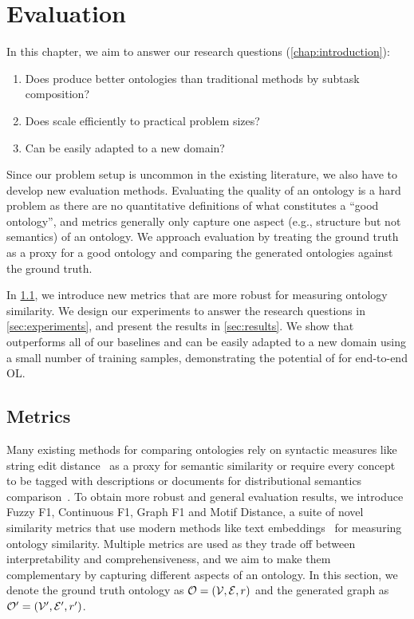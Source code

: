 \chapter{Evaluation}  \label{chap:evaluation}

In this chapter, we aim to answer our research questions (\cref{chap:introduction}):
\begin{enumerate}
    \item Does \name produce better ontologies than traditional methods by subtask composition?
    \item Does \name scale efficiently to practical problem sizes?
    \item Can \name be easily adapted to a new domain?
\end{enumerate}
Since our problem setup is uncommon in the existing literature, we also have to develop new evaluation methods. Evaluating the quality of an ontology is a hard problem as there are no quantitative definitions of what constitutes a ``good ontology'', and metrics generally only capture one aspect (e.g., structure but not semantics) of an ontology. We approach evaluation by treating the ground truth as a proxy for a good ontology and comparing the generated ontologies against the ground truth.

In \cref{sec:metrics}, we introduce new metrics that are more robust for measuring ontology similarity. We design our experiments to answer the research questions in \cref{sec:experiments}, and present the results in \cref{sec:results}. We show that \name outperforms all of our baselines and can be easily adapted to a new domain using a small number of training samples, demonstrating the potential of \name for end-to-end OL.

\section{Metrics}  \label{sec:metrics}

Many existing methods for comparing ontologies rely on syntactic measures like string edit distance~\cite{Ehrig2005SimilarityFO} as a proxy for semantic similarity or require every concept to be tagged with descriptions or documents for distributional semantics comparison~\cite{Zavitsanos2011GoldSE}. To obtain more robust and general evaluation results, we introduce Fuzzy F1, Continuous F1, Graph F1 and Motif Distance, a suite of novel similarity metrics that use modern methods like text embeddings~\cite{reimers-2019-sentence-bert} for measuring ontology similarity. Multiple metrics are used as they trade off between interpretability and comprehensiveness, and we aim to make them complementary by capturing different aspects of an ontology. In this section, we denote the ground truth ontology as $\mathcal{O} = (\mathcal{V}, \mathcal{E}, r)$ and the generated graph as $\mathcal{O}' = (\mathcal{V}', \mathcal{E}', r')$.

